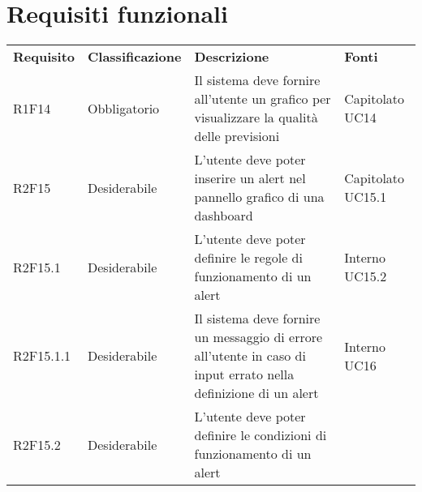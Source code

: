 \section{Requisiti funzionali}
\begin{longtable} {
		>{\centering}p{18mm} 
		>{\centering}p{28mm}
		>{}p{50mm} 
		>{}p{28mm}
	}

	\rowcolor{gray!50}

		\textbf{Requisito} & 

		\textbf{Classificazione} & 

		\textbf{Descrizione} & 

		\textbf{Fonti} 	\TBstrut \\

		

		R1F14 & 

		Obbligatorio & 

		Il sistema deve fornire all'utente un grafico per visualizzare la qualità delle previsioni & 

		Capitolato UC14 \TBstrut \\ [2mm]

		

		R2F15 &

		Desiderabile &

		L'utente deve poter inserire un alert nel pannello grafico di una dashboard\glo &

		Capitolato UC15.1 \TBstrut \\ [2mm]

		

		R2F15.1 &

		Desiderabile &

		L'utente deve poter definire le regole di funzionamento di un alert &

		Interno UC15.2 \TBstrut \\ [2mm]

		

		R2F15.1.1 &

		Desiderabile &

		Il sistema deve fornire un messaggio di errore all'utente in caso di input errato nella definizione di un alert &

		Interno UC16 \TBstrut \\ [2mm]

		

		R2F15.2 & 

		Desiderabile & 

		L'utente deve poter definire le condizioni di funzionamento di un alert &


\end{longtable}
